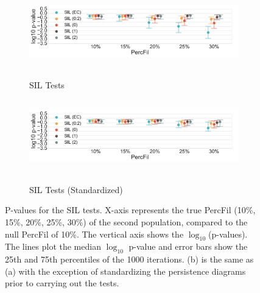 \documentclass[12pt]{article}
\begin{document}
\begin{figure}[htp!]
  \centering
  \begin{subfigure}{.75\textwidth}
    \centering
    \caption{SIL Tests}
    \includegraphics[height = 1.25in]{figure_8_silhouette_group.pdf}
    \label{fig:sub_silh}
  \end{subfigure}
  \begin{subfigure}{.75\textwidth}
    \centering
    \caption{SIL Tests (Standardized)}
    \includegraphics[height = 1.25in]{figure_8_silhouette_group_normed.pdf}
    \label{fig:sub_silh_normed}
  \end{subfigure}
\label{fig:sub_silh_results}
\caption{P-values for the SIL tests. X-axis represents the true PercFil (10\%, 15\%, 20\%, 25\%, 30\%) of the second population, compared to the null PercFil of 10\%.
The vertical axis shows the $\log_{10}$(p-values). The lines plot the median $\log_{10}$ p-value and error bars show the 25th and 75th percentiles of the 1000 iterations. (b) is the same as (a) with the exception of standardizing the persistence diagrams prior to carrying out the tests. }
\end{figure}
\end{document}
